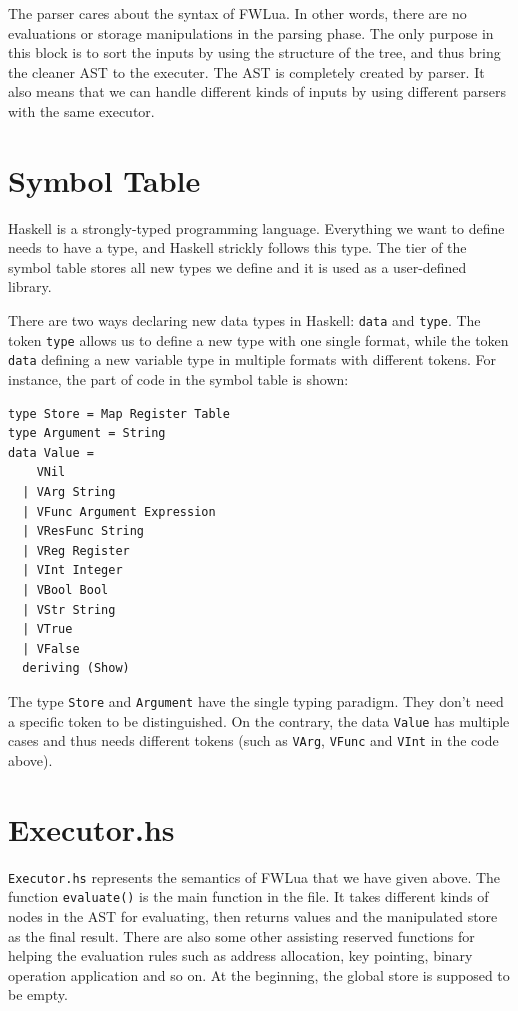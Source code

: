 The parser cares about the syntax of FWLua. In other words, there are no evaluations or storage manipulations in the parsing phase. The only purpose in this block is to sort the inputs by using the structure of the tree, and thus bring the cleaner AST to the executer. The AST is completely created by parser. It also means that we can handle different kinds of inputs by using different parsers with the same executor.

\section{Symbol Table}
Haskell is a strongly-typed programming language. Everything we want to define needs to have a type, and Haskell strickly follows this type. The tier of the symbol table stores all new types we define and it is used as a user-defined library.

There are two ways declaring new data types in Haskell: {\tt data} and {\tt type}. The token {\tt type} allows us to define a new type with one single format, while the token {\tt data} defining a new variable type in multiple formats with different tokens. For instance, the part of code in the symbol table is shown:

\begin{verbatim}
type Store = Map Register Table
type Argument = String
data Value = 
    VNil
  | VArg String
  | VFunc Argument Expression
  | VResFunc String
  | VReg Register
  | VInt Integer
  | VBool Bool
  | VStr String
  | VTrue
  | VFalse
  deriving (Show)
\end{verbatim}

The type {\tt Store} and {\tt Argument} have the single typing paradigm. They don't need a specific token to be distinguished. On the contrary, the data {\tt Value} has multiple cases and thus needs different tokens (such as {\tt VArg}, {\tt VFunc} and {\tt VInt} in the code above).

\section{Executor.hs}
{\tt Executor.hs} represents the semantics of FWLua that we have given above. The function {\tt evaluate()} is the main function in the file. It takes different kinds of nodes in the AST for evaluating, then returns values and the manipulated store as the final result. There are also some other assisting reserved functions for helping the evaluation rules such as address allocation, key pointing, binary operation application and so on. At the beginning, the global store is supposed to be empty.

